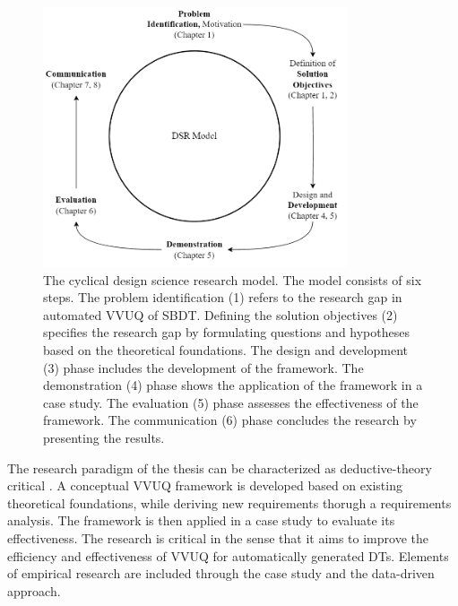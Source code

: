 \begin{figure}[htbp]
  \centering
  \includegraphics[width=0.8\textwidth]{figures/dsr.png}
  \caption{The cyclical design science research model. The model consists of six steps. The problem identification (1) refers to the research gap in automated VVUQ of SBDT. Defining the solution objectives (2) specifies the research gap by formulating questions and hypotheses based on the theoretical foundations. The design and development (3) phase includes the development of the framework. The demonstration (4) phase shows the application of the framework in a case study. The evaluation (5) phase assesses the effectiveness of the framework. The communication (6) phase concludes the research by presenting the results.}
  \label{fig:DSR}
\end{figure}

The research paradigm of the thesis can be characterized as deductive-theory critical \parencite{eberhard1987einfuhrung}. A conceptual VVUQ framework is developed based on existing theoretical foundations, while deriving new requirements thorugh a requirements analysis. The framework is then applied in a case study to evaluate its effectiveness. The research is critical in the sense that it aims to improve the efficiency and effectiveness of VVUQ for automatically generated DTs. Elements of empirical research are included through the case study and the data-driven approach.


